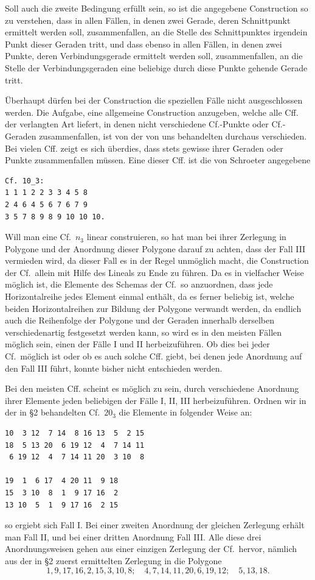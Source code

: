 \documentclass[11pt]{article}
\newcommand{\Cf}{\textup{Cf.}}
\begin{document}
Soll auch die zweite Bedingung erfüllt sein, so ist die angegebene Construction so zu verstehen, dass in allen Fällen, in denen zwei Gerade, deren Schnittpunkt ermittelt werden soll, zusammenfallen, an die Stelle des Schnittpunktes irgendein Punkt dieser Geraden tritt, und dass ebenso in allen Fällen, in denen zwei Punkte, deren Verbindungsgerade ermittelt werden soll, zusammenfallen, an die Stelle der Verbindungsgeraden eine beliebige durch diese Punkte gehende Gerade tritt.

Überhaupt dürfen bei der Construction die speziellen Fälle nicht ausgeschlossen werden. Die Aufgabe, eine allgemeine Construction anzugeben, welche alle Cff. der verlangten Art liefert, in denen nicht verschiedene \Cf-Punkte oder \Cf-Geraden zusammenfallen, ist von der von uns behandelten durchaus verschieden. Bei vielen Cff. zeigt es sich überdies, dass stets gewisse ihrer Geraden oder Punkte zusammenfallen müssen. Eine dieser Cff. ist die von Schroeter angegebene
\small
\begin{verbatim}
Cf. 10_3:
1 1 1 2 2 3 3 4 5 8
2 4 6 4 5 6 7 6 7 9
3 5 7 8 9 8 9 10 10 10.
\end{verbatim}
\normalsize

Will man eine \Cf\ $n_3$ linear construieren, so hat man bei ihrer Zerlegung in Polygone und der Anordnung dieser Polygone darauf zu achten, dass der Fall III vermieden wird, da dieser Fall es in der Regel unmöglich macht, die Construction der \Cf\ allein mit Hilfe des Lineals zu Ende zu führen. Da es in vielfacher Weise möglich ist, die Elemente des Schemas der \Cf\ so anzuordnen, dass jede Horizontalreihe jedes Element einmal enthält, da es ferner beliebig ist, welche beiden Horizontalreihen zur Bildung der Polygone verwandt werden, da endlich auch die Reihenfolge der Polygone und der Geraden innerhalb derselben verschiedenartig festgesetzt werden kann, so wird es in den meisten Fällen möglich sein, einen der Fälle I und II herbeizuführen. Ob dies bei jeder \Cf\ möglich ist oder ob es auch solche Cff. giebt, bei denen jede Anordnung auf den Fall III führt, konnte bisher nicht entschieden werden.

Bei den meisten Cff. scheint es möglich zu sein, durch verschiedene Anordnung ihrer Elemente jeden beliebigen der Fälle I, II, III herbeizuführen. Ordnen wir in der in \S 2 behandelten \Cf\ $20_3$ die Elemente in folgender Weise an:
\small
\begin{verbatim}
10  3 12  7 14  8 16 13  5  2 15
18  5 13 20  6 19 12  4  7 14 11
 6 19 12  4  7 14 11 20  3 10  8

19  1  6 17  4 20 11  9 18
15  3 10  8  1  9 17 16  2
13 10  5  1  9 17 16  2 15
\end{verbatim}
\normalsize
so ergiebt sich Fall I. Bei einer zweiten Anordnung der gleichen Zerlegung erhält man Fall II, und bei einer dritten Anordnung Fall III. Alle diese drei Anordnungsweisen gehen aus einer einzigen Zerlegung der \Cf\ hervor, nämlich aus der in \S 2 zuerst ermittelten Zerlegung in die Polygone
\[
1,9,17,16,2,15,3,10,8;
\quad 4,7,14,11,20,6,19,12;
\quad 5,13,18.
\]
\end{document}

